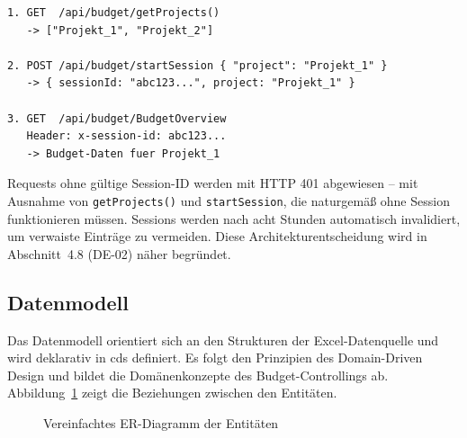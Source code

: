 \begin{lstlisting}[caption={Session-Flow}, label={lst:session-flow}]
1. GET  /api/budget/getProjects()
   -> ["Projekt_1", "Projekt_2"]

2. POST /api/budget/startSession { "project": "Projekt_1" }
   -> { sessionId: "abc123...", project: "Projekt_1" }

3. GET  /api/budget/BudgetOverview
   Header: x-session-id: abc123...
   -> Budget-Daten fuer Projekt_1
\end{lstlisting}

Requests ohne gültige Session-ID werden mit HTTP 401 abgewiesen -- mit Ausnahme von \texttt{getProjects()} und \texttt{startSession}, die naturgemäß ohne Session funktionieren müssen. Sessions werden nach acht Stunden automatisch invalidiert, um verwaiste Einträge zu vermeiden. Diese Architekturentscheidung wird in Abschnitt~4.8 (DE-02) näher begründet.

\subsection{Datenmodell}

Das Datenmodell orientiert sich an den Strukturen der Excel-Datenquelle und wird deklarativ in \gls{cds} definiert. Es folgt den Prinzipien des Domain-Driven Design \citep{evans2003, vernon2013} und bildet die Domänenkonzepte des Budget-Controllings ab. Abbildung~\ref{fig:er-diagramm} zeigt die Beziehungen zwischen den Entitäten.

\begin{figure}[H]
\centering
{}
\caption{Vereinfachtes ER-Diagramm der Entitäten}
\label{fig:er-diagramm}
\end{figure}

